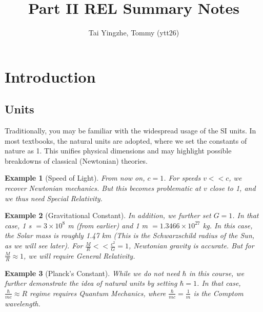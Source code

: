 \documentclass[a4paper]{article}
\title{\textbf{Part II REL Summary Notes}}
\author{Tai Yingzhe, Tommy (ytt26)}
\date{}
\newtheorem{eg}{Example}[section]
\theoremstyle{new}
\begin{document}
\maketitle
\tableofcontents

\section{Introduction}
\subsection{Units}
Traditionally, you may be familiar with the widespread usage of the SI units. In most textbooks, the natural units are adopted, where we set the constants of nature as 1. This unifies physical dimensions and may highlight possible breakdowns of classical (Newtonian) theories. 
\begin{eg}[Speed of Light]
From now on, $c=1$. For speeds $v<<c$, we recover Newtonian mechanics. But this becomes problematic at $v$ close to 1, and we thus need Special Relativity.
\end{eg}
\begin{eg}[Gravitational Constant]
In addition, we further set $G=1$. In that case, 1 s $=3\times10^8$ m (from earlier) and 1 m $=1.3466\times10^{27}$ kg. In this case, the Solar mass is roughly 1.47 km (This is the Schwarzschild radius of the Sun, as we will see later). For $\frac{M}{R}<<\frac{c^2}{G}=1$, Newtonian gravity is accurate. But for $\frac{M}{R}\approx 1$, we will require General Relativity.
\end{eg}
\begin{eg}[Planck's Constant]
While we do not need $\hbar$ in this course, we further demonstrate the idea of natural units by setting $\hbar=1$. In that case, $\frac{\hbar}{mc}\approx R$ regime requires Quantum Mechanics, where $\frac{\hbar}{mc}=\frac{1}{m}$ is the Comptom wavelength.
\end{eg}
\newpage
\end{document}
